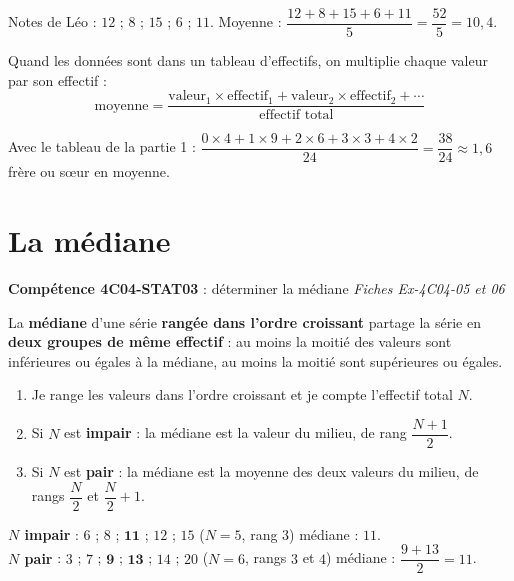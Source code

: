 \documentclass[11pt]{article}
\newcommand{\comp}[2]{\par\smallskip\noindent\colorbox{gray!15}{\parbox{\dimexpr\linewidth-2\fboxsep}{\small\textbf{Compétence #1} : #2}}\par\smallskip}
\newcommand{\f}[2]{\dfrac{#1}{#2}}
\begin{document}
\begin{exemple}
Notes de Léo : $12$ ; $8$ ; $15$ ; $6$ ; $11$. \quad
Moyenne : $\f{12 + 8 + 15 + 6 + 11}{5} = \f{52}{5} = 10,4$.
\end{exemple}

\begin{definition}
Quand les données sont dans un tableau d'effectifs, on multiplie chaque valeur par son effectif :
\[ \text{moyenne} = \f{\text{valeur}_1 \times \text{effectif}_1 + \text{valeur}_2 \times \text{effectif}_2 + \cdots}{\text{effectif total}} \]
\end{definition}

\begin{exemple}
Avec le tableau de la partie 1 :
$\f{0\times 4 + 1\times 9 + 2\times 6 + 3\times 3 + 4\times 2}{24} = \f{38}{24} \approx 1,6$ frère ou sœur en moyenne.
\end{exemple}

\section{La médiane}
\comp{4C04-STAT03}{déterminer la médiane \hfill \textit{Fiches Ex-4C04-05 et 06}}

\begin{definition}
La \textbf{médiane} d'une série \textbf{rangée dans l'ordre croissant} partage la série en \textbf{deux groupes de même effectif} :
au moins la moitié des valeurs sont inférieures ou égales à la médiane, au moins la moitié sont supérieures ou égales.
\end{definition}

\begin{propriete}[Méthode]
\begin{enumerate}
\item Je range les valeurs dans l'ordre croissant et je compte l'effectif total $N$.
\item Si $N$ est \textbf{impair} : la médiane est la valeur du milieu, de rang $\f{N+1}{2}$.
\item Si $N$ est \textbf{pair} : la médiane est la moyenne des deux valeurs du milieu, de rangs $\f{N}{2}$ et $\f{N}{2}+1$.
\end{enumerate}
\end{propriete}

\begin{exemple}
\textbf{$N$ impair} : $6$ ; $8$ ; $\mathbf{11}$ ; $12$ ; $15$ \quad ($N = 5$, rang $3$) \quad médiane : $11$.\\
\textbf{$N$ pair} : $3$ ; $7$ ; $\mathbf{9}$ ; $\mathbf{13}$ ; $14$ ; $20$ \quad ($N = 6$, rangs $3$ et $4$) \quad médiane : $\f{9 + 13}{2} = 11$.
\end{exemple}
\end{document}
